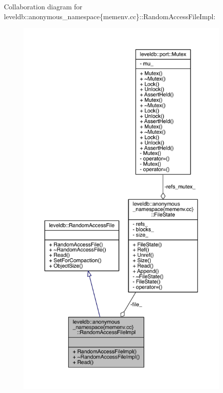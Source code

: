 Collaboration diagram for leveldb\+:\+:anonymous\+\_\+namespace\{memenv.\+cc\}\+:\+:Random\+Access\+File\+Impl\+:
\nopagebreak
\begin{figure}[H]
\begin{center}
\leavevmode
\includegraphics[height=550pt]{classleveldb_1_1anonymous__namespace_02memenv_8cc_03_1_1_random_access_file_impl__coll__graph}
\end{center}
\end{figure}
